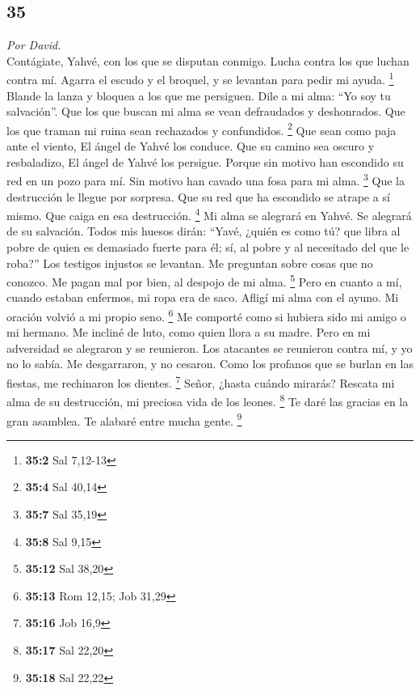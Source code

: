 \begin{paracol}{2}
\hypertarget{section-68}{%
\section{35}\label{section-68}}

\emph{Por David.}\\
 Contágiate, Yahvé, con los que se disputan conmigo. Lucha
contra los que luchan contra mí.  Agarra el escudo y el
broquel, y se levantan para pedir mi ayuda. \footnote{\textbf{35:2} Sal
  7,12-13}  Blande la lanza y bloquea a los que me
persiguen. Dile a mi alma: ``Yo soy tu salvación''.  Que
los que buscan mi alma se vean defraudados y deshonrados. Que los que
traman mi ruina sean rechazados y confundidos. \footnote{\textbf{35:4}
  Sal 40,14}  Que sean como paja ante el viento, El ángel
de Yahvé los conduce.  Que su camino sea oscuro y
resbaladizo, El ángel de Yahvé los persigue.  Porque sin
motivo han escondido su red en un pozo para mí. Sin motivo han cavado
una fosa para mi alma. \footnote{\textbf{35:7} Sal 35,19} 
Que la destrucción le llegue por sorpresa. Que su red que ha escondido
se atrape a sí mismo. Que caiga en esa destrucción. \footnote{\textbf{35:8}
  Sal 9,15}  Mi alma se alegrará en Yahvé. Se alegrará de
su salvación.  Todos mis huesos dirán: ``Yavé, ¿quién es
como tú? que libra al pobre de quien es demasiado fuerte para él; sí, al
pobre y al necesitado del que le roba?''  Los testigos
injustos se levantan. Me preguntan sobre cosas que no conozco.
 Me pagan mal por bien, al despojo de mi alma.
\footnote{\textbf{35:12} Sal 38,20}  Pero en cuanto a mí,
cuando estaban enfermos, mi ropa era de saco. Afligí mi alma con el
ayuno. Mi oración volvió a mi propio seno. \footnote{\textbf{35:13} Rom
  12,15; Job 31,29}  Me comporté como si hubiera sido mi
amigo o mi hermano. Me incliné de luto, como quien llora a su madre.
 Pero en mi adversidad se alegraron y se reunieron. Los
atacantes se reunieron contra mí, y yo no lo sabía. Me desgarraron, y no
cesaron.  Como los profanos que se burlan en las fiestas,
me rechinaron los dientes. \footnote{\textbf{35:16} Job 16,9}
 Señor, ¿hasta cuándo mirarás? Rescata mi alma de su
destrucción, mi preciosa vida de los leones. \footnote{\textbf{35:17}
  Sal 22,20}  Te daré las gracias en la gran asamblea. Te
alabaré entre mucha gente. \footnote{\textbf{35:18} Sal 22,22}

\end{paracol}
